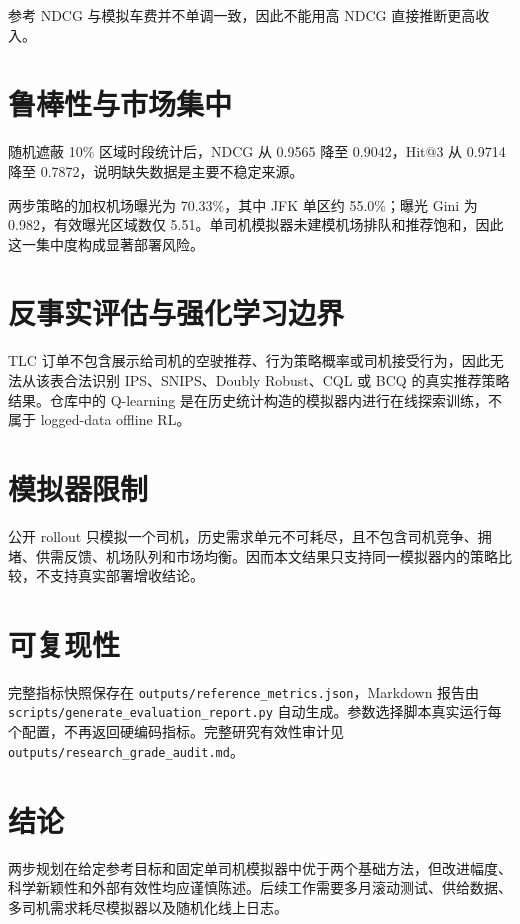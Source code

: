 \documentclass[11pt,a4paper]{ctexart}
\begin{document}
参考 NDCG 与模拟车费并不单调一致，因此不能用高 NDCG 直接推断更高收入。

\section{鲁棒性与市场集中}

随机遮蔽 10\% 区域时段统计后，NDCG 从 0.9565 降至 0.9042，Hit@3 从 0.9714 降至 0.7872，说明缺失数据是主要不稳定来源。

两步策略的加权机场曝光为 70.33\%，其中 JFK 单区约 55.0\%；曝光 Gini 为 0.982，有效曝光区域数仅 5.51。单司机模拟器未建模机场排队和推荐饱和，因此这一集中度构成显著部署风险。

\section{反事实评估与强化学习边界}

TLC 订单不包含展示给司机的空驶推荐、行为策略概率或司机接受行为，因此无法从该表合法识别 IPS、SNIPS、Doubly Robust、CQL 或 BCQ 的真实推荐策略结果。仓库中的 Q-learning 是在历史统计构造的模拟器内进行在线探索训练，不属于 logged-data offline RL。

\section{模拟器限制}

公开 rollout 只模拟一个司机，历史需求单元不可耗尽，且不包含司机竞争、拥堵、供需反馈、机场队列和市场均衡。因而本文结果只支持同一模拟器内的策略比较，不支持真实部署增收结论。

\section{可复现性}

完整指标快照保存在 \texttt{outputs/reference\_metrics.json}，Markdown 报告由 \texttt{scripts/generate\_evaluation\_report.py} 自动生成。参数选择脚本真实运行每个配置，不再返回硬编码指标。完整研究有效性审计见 \texttt{outputs/research\_grade\_audit.md}。

\section{结论}

两步规划在给定参考目标和固定单司机模拟器中优于两个基础方法，但改进幅度、科学新颖性和外部有效性均应谨慎陈述。后续工作需要多月滚动测试、供给数据、多司机需求耗尽模拟器以及随机化线上日志。
\end{document}
